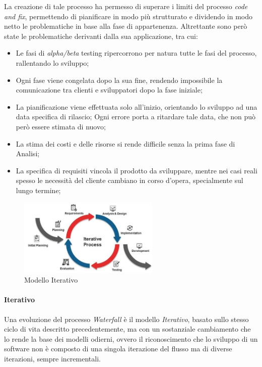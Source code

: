 \documentclass[a4paper,12pt]{report}
\begin{document}
				\vspace{5mm}
				La creazione di tale processo ha permesso di superare i limiti del processo \emph{code and fix}, permettendo di pianificare
				in modo più strutturato e dividendo in modo netto le problematiche in base alla fase di appartenenza.
				Altrettante sono però state le problematiche derivanti dalla sua applicazione, tra cui:
				\begin{itemize}
					\item Le fasi di \emph{alpha/beta} testing ripercorrono per natura tutte le fasi del processo, rallentando lo sviluppo;
					\item Ogni fase viene congelata dopo la sua fine, rendendo impossibile la comunicazione tra clienti e sviluppatori dopo la fase iniziale;
					\item La pianificazione viene effettuata solo all'inizio, orientando lo sviluppo ad una data specifica di rilascio; Ogni errore porta a ritardare tale data, che non può però essere stimata di nuovo;
					\item La stima dei costi e delle risorse si rende difficile senza la prima fase di Analisi;
					\item La specifica di requisiti vincola il prodotto da sviluppare, mentre nei casi reali spesso le necessità del cliente cambiano in corso d'opera, specialmente sul lungo termine;
				\end{itemize}
	
				\begin{figure}[h]
					\centering
					\includegraphics[width=0.6\textwidth]{iterative}
					\caption{Modello Iterativo}
					\label{fig:iterative}
				\end{figure}
	
				\paragraph{Iterativo}
				Una evoluzione del processo \emph{Waterfall} è il modello \emph{Iterativo}, basato sullo stesso ciclo di vita descritto precedentemente, ma con un sostanziale cambiamento che lo rende la base dei modelli odierni, ovvero il riconoscimento che
				lo sviluppo di un software non è composto di una singola iterazione del flusso ma di diverse iterazioni, sempre incrementali.
				
\end{document}
